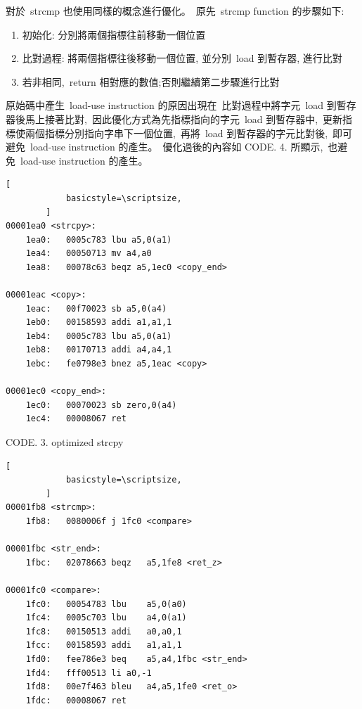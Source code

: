 \documentclass{article}
\begin{document}
\begin{CJK*}{UTF8}{bsmi}
\begin{multicols}{2}
\begin{flushleft}
    對於\ strcmp 也使用同樣的概念進行優化。\ 
    原先\ strcmp function 的步驟如下:\newline
    \begin{enumerate}
        \item 初始化: 分別將兩個指標往前移動一個位置
        \item 比對過程: 將兩個指標往後移動一個位置, 並分別\ load 到暫存器, 進行比對
        \item 若非相同,\ return 相對應的數值;否則繼續第二步驟進行比對\newline
    \end{enumerate}
    原始碼中產生\ load-use instruction 的原因出現在\ 
    比對過程中將字元\ load 到暫存器後馬上接著比對,\
    因此優化方式為先指標指向的字元\ load 到暫存器中,\ 
    更新指標使兩個指標分別指向字串下一個位置,\
    再將\ load 到暫存器的字元比對後,\
    即可避免\ load-use instruction 的產生。\
    優化過後的內容如 CODE. 4. 所顯示,\
    也避免\ load-use instruction 的產生。
    
    \begin{center}
        \begin{lstlisting}[
            basicstyle=\scriptsize, 
        ]
00001ea0 <strcpy>:
    1ea0:	0005c783 lbu a5,0(a1)
    1ea4:	00050713 mv	a4,a0
    1ea8:	00078c63 beqz a5,1ec0 <copy_end>

00001eac <copy>:
    1eac:	00f70023 sb	a5,0(a4)
    1eb0:	00158593 addi a1,a1,1
    1eb4:	0005c783 lbu a5,0(a1)
    1eb8:	00170713 addi a4,a4,1
    1ebc:	fe0798e3 bnez a5,1eac <copy>

00001ec0 <copy_end>:
    1ec0:	00070023 sb	zero,0(a4)
    1ec4:	00008067 ret
        \end{lstlisting}
        \small CODE. 3. optimized strcpy
    \end{center}

    \columnbreak

    \begin{center}
        \begin{lstlisting}[
            basicstyle=\scriptsize, 
        ]
00001fb8 <strcmp>:
    1fb8:	0080006f j 1fc0 <compare>

00001fbc <str_end>:
    1fbc:	02078663 beqz	a5,1fe8 <ret_z>

00001fc0 <compare>:
    1fc0:	00054783 lbu	a5,0(a0)
    1fc4:	0005c703 lbu	a4,0(a1)
    1fc8:	00150513 addi	a0,a0,1
    1fcc:	00158593 addi	a1,a1,1
    1fd0:	fee786e3 beq	a5,a4,1fbc <str_end>
    1fd4:	fff00513 li	a0,-1
    1fd8:	00e7f463 bleu	a4,a5,1fe0 <ret_o>
    1fdc:	00008067 ret


\end{lstlisting}
\end{center}
\end{flushleft}
\end{multicols}
\end{CJK*}
\end{document}

